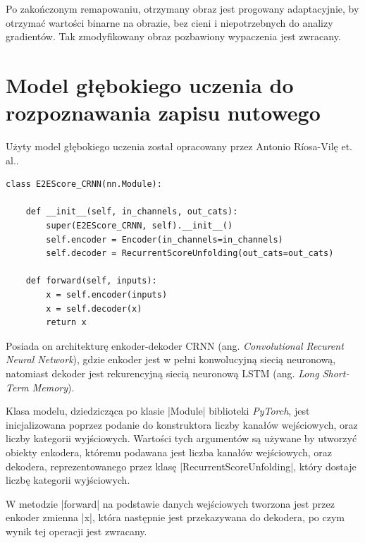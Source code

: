 Po zakończonym remapowaniu, otrzymany obraz jest progowany adaptacyjnie, by otrzymać wartości binarne na obrazie, bez cieni i niepotrzebnych do analizy gradientów. Tak zmodyfikowany obraz pozbawiony wypaczenia jest zwracany.






\section{Model głębokiego uczenia do rozpoznawania zapisu nutowego} \label{Model}
Użyty model głębokiego uczenia został opracowany przez Antonio Ríosa-Vilę et. al.\cite{Rios-Vila2023}. 

\begin{lstlisting}[caption={\pyth|E2EScore_CRNN| - klasa modelu głębokiego uczenia do rozpoznawania zapisu nutowego.}, label={E2E-CRNN}]
class E2EScore_CRNN(nn.Module):

	def __init__(self, in_channels, out_cats):
		super(E2EScore_CRNN, self).__init__()
		self.encoder = Encoder(in_channels=in_channels)		
		self.decoder = RecurrentScoreUnfolding(out_cats=out_cats)
	
	def forward(self, inputs):
		x = self.encoder(inputs)
		x = self.decoder(x)
		return x
\end{lstlisting}

Posiada on architekturę enkoder-dekoder CRNN (ang. \textit{Convolutional Recurent Neural Network}), gdzie enkoder jest w pełni konwolucyjną siecią neuronową, natomiast dekoder jest rekurencyjną siecią neuronową LSTM (ang. \textit{Long Short-Term Memory}).

Klasa modelu, dziedzicząca po klasie \pyth|Module| biblioteki \textit{PyTorch}, jest inicjalizowana poprzez podanie do konstruktora liczby kanałów wejściowych, oraz liczby kategorii wyjściowych. Wartości tych argumentów są używane by utworzyć obiekty enkodera, któremu podawana jest liczba kanałów wejściowych, oraz dekodera, reprezentowanego przez klasę \pyth|RecurrentScoreUnfolding|, który dostaje liczbę kategorii wyjściowych.

W metodzie \pyth|forward| na podstawie danych wejściowych tworzona jest przez enkoder zmienna \pyth|x|, która następnie jest przekazywana do dekodera, po czym wynik tej operacji jest zwracany.



